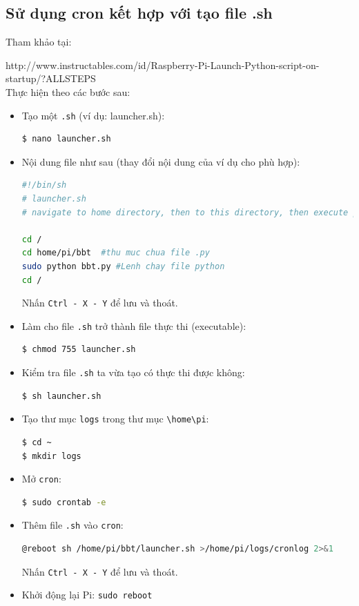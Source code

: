 \subsection{Sử dụng cron kết hợp với tạo file .sh}
Tham khảo tại:

\textsf{http://www.instructables.com/id/Raspberry-Pi-Launch-Python-script-on-startup/?ALLSTEPS}\\

Thực hiện theo các bước sau:
\begin{itemize}
\item Tạo một \verb|.sh| (ví dụ: launcher.sh):
\begin{lstlisting}[language=bash]
$ nano launcher.sh
\end{lstlisting}
\item Nội dung file như sau (thay đổi nội dung của ví dụ cho phù hợp):
\begin{lstlisting}[language=bash]
#!/bin/sh
# launcher.sh
# navigate to home directory, then to this directory, then execute python script, then back home

cd /
cd home/pi/bbt  #thu muc chua file .py
sudo python bbt.py #Lenh chay file python
cd /
\end{lstlisting}
Nhấn \verb|Ctrl - X - Y| để lưu và thoát.
\item Làm cho file \verb|.sh| trở thành file thực thi (executable): 
\begin{lstlisting}[language=bash]
$ chmod 755 launcher.sh
\end{lstlisting}
\item Kiểm tra file \verb|.sh| ta vừa tạo có thực thi được không:
\begin{lstlisting}[language=bash]
$ sh launcher.sh
\end{lstlisting}
\item Tạo thư mục \verb|logs| trong thư mục \verb|\home\pi|:
\begin{lstlisting}[language=bash]
$ cd ~
$ mkdir logs
\end{lstlisting}
\item Mở \verb|cron|:
\begin{lstlisting}[language=bash]
$ sudo crontab -e
\end{lstlisting}
\item Thêm file \verb|.sh| vào \verb|cron|:
\begin{lstlisting}[language=bash]
@reboot sh /home/pi/bbt/launcher.sh >/home/pi/logs/cronlog 2>&1
\end{lstlisting}
Nhấn \verb|Ctrl - X - Y| để lưu và thoát.
\item Khởi động lại Pi: \verb|sudo reboot|
\end{itemize}
